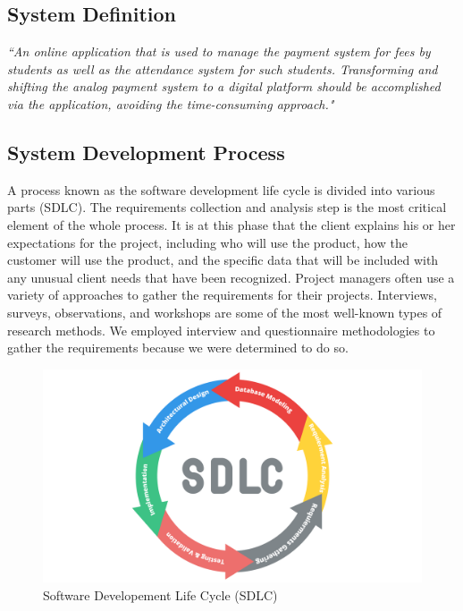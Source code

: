 \clearpage

\subsection{System Definition}\label{subsec:sd} 

\textit{``An online application that is used to manage the payment system for fees by students as well as the attendance system for such students. Transforming and shifting the analog payment system to a digital platform should be accomplished via the application, avoiding the time-consuming approach."}


\subsection{System Development Process}\label{subsec:sdp}

A process known as the software development life cycle is divided into various parts (SDLC). The requirements collection and analysis step is the most critical element of the whole process. It is at this phase that the client explains his or her expectations for the project, including who will use the product, how the customer will use the product, and the specific data that will be included with any unusual client needs that have been recognized. Project managers often use a variety of approaches to gather the requirements for their projects. Interviews, surveys, observations, and workshops are some of the most well-known types of research methods. We employed interview and questionnaire methodologies to gather the requirements because we were determined to do so.\\

\begin{figure}[H]
    \centering
    \includegraphics[width=1\textwidth]{images/sdlc}
    \caption{Software Developement Life Cycle (SDLC)}
    \label{fig:sdlc}
\end{figure}

